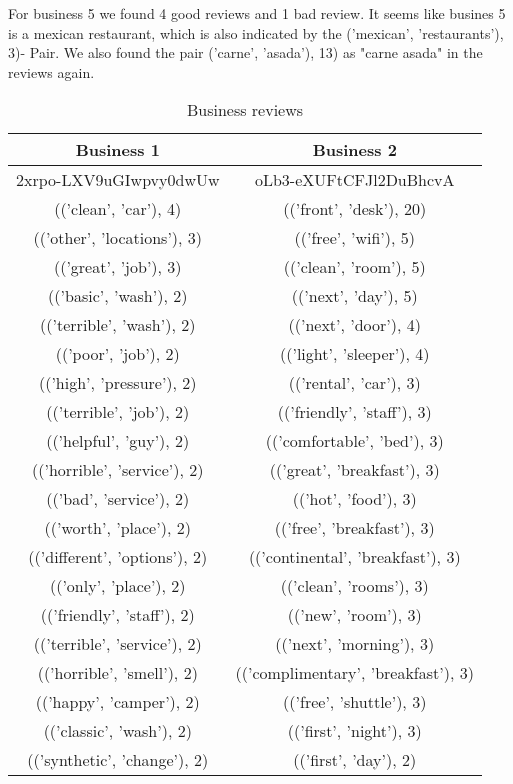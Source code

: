 For business 5 we found 4 good reviews and 1 bad review. It seems like busines 5 is a mexican restaurant, which is also indicated by the ('mexican', 'restaurants'), 3)- Pair. We also found the pair ('carne', 'asada'), 13) as "carne asada" in the reviews again.\\
	
	\begin{center}
		\tiny
		\begin{table}[!h]
		\caption{Business reviews}
		\begin{tabular}{c | c}
			\textbf{Business 1}			&\textbf{Business 2}\\ \hline
			2xrpo-LXV9uGIwpvy0dwUw		&oLb3-eXUFtCFJl2DuBhcvA\\\hline
			(('clean', 'car'), 4)		&(('front', 'desk'), 20)\\
			(('other', 'locations'), 3)		&(('free', 'wifi'), 5)\\
			(('great', 'job'), 3)		&(('clean', 'room'), 5)\\
			(('basic', 'wash'), 2)		&(('next', 'day'), 5)\\
			(('terrible', 'wash'), 2)		&(('next', 'door'), 4)\\
			(('poor', 'job'), 2)		&(('light', 'sleeper'), 4)\\
			(('high', 'pressure'), 2)		&(('rental', 'car'), 3)\\
			(('terrible', 'job'), 2)		&(('friendly', 'staff'), 3)\\
			(('helpful', 'guy'), 2)		&(('comfortable', 'bed'), 3)\\
			(('horrible', 'service'), 2)		&(('great', 'breakfast'), 3)\\
			(('bad', 'service'), 2)		&(('hot', 'food'), 3)\\
			(('worth', 'place'), 2)		&(('free', 'breakfast'), 3)\\
			(('different', 'options'), 2)		&(('continental', 'breakfast'), 3)\\
			(('only', 'place'), 2)		&(('clean', 'rooms'), 3)\\
			(('friendly', 'staff'), 2)		&(('new', 'room'), 3)\\
			(('terrible', 'service'), 2)		&(('next', 'morning'), 3)\\
			(('horrible', 'smell'), 2)		&(('complimentary', 'breakfast'), 3)\\
			(('happy', 'camper'), 2)		&(('free', 'shuttle'), 3)\\
			(('classic', 'wash'), 2)		&(('first', 'night'), 3)\\
			(('synthetic', 'change'), 2)		&(('first', 'day'), 2)\\
		\end{tabular}
	\end{table}
	\end{center}

